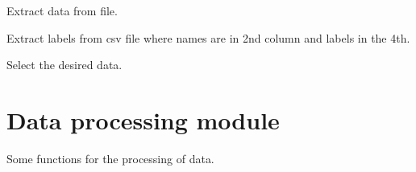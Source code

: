 \documentclass[letterpaper,10pt,english]{sphinxmanual}
\begin{document}
\begin{fulllineitems}
\label{\detokenize{dataETL:dataETL.extractData}}
\sphinxAtStartPar
Extract data from file.

\end{fulllineitems}


\begin{fulllineitems}
\label{\detokenize{dataETL:dataETL.extractLabels}}
\sphinxAtStartPar
Extract labels from csv file where names are in 2nd column and labels in the 4th.

\end{fulllineitems}


\begin{fulllineitems}
\label{\detokenize{dataETL:dataETL.selectData}}
\sphinxAtStartPar
Select the desired data.

\end{fulllineitems}



\section{Data processing module}
\label{\detokenize{dataProcessing:module-dataProcessing}}\label{\detokenize{dataProcessing:data-processing-module}}\label{\detokenize{dataProcessing::doc}}
\sphinxAtStartPar
Some functions for the processing of data.
\end{document}
